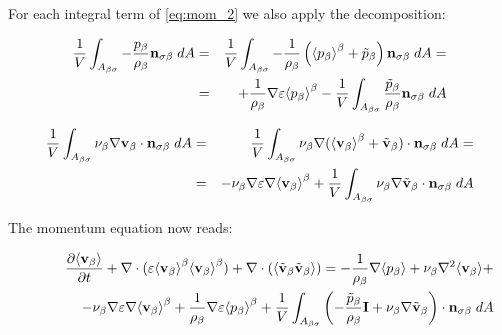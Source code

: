 For each integral term of \ref{eq:mom_2} we also apply the decomposition:

\begin{eqnarray}
\dfrac{1}{V} \int_{A_{\beta \sigma}}  -\dfrac{p_{\beta}}{\rho_{\beta}} \mathbf{n}_{\sigma \beta} \;dA &=& \dfrac{1}{V} \int_{A_{\beta \sigma}}  -\dfrac{1}{\rho_{\beta}} \left({\left< p_{\beta} \right>}^{\beta}  + \tilde{p}_{\beta}\right) \mathbf{n}_{\sigma \beta} \;dA = \nonumber \\
&=& +\dfrac{1}{\rho_{\beta}}\nabla\varepsilon {\left< p_{\beta}\right>}^{\beta} - \dfrac{1}{V} \int_{A_{\beta \sigma}} \dfrac{\tilde{p}_{\beta}}{\rho_{\beta}} \mathbf{n}_{\sigma \beta} \;dA
\end{eqnarray}


\begin{eqnarray}
\dfrac{1}{V} \int_{A_{\beta \sigma}} \nu_{\beta} \nabla \textbf{v}_{\beta} \cdot \mathbf{n}_{\sigma \beta} \;dA &=& \dfrac{1}{V} \int_{A_{\beta \sigma}} \nu_{\beta} \nabla ({\left< \textbf{v}_{\beta} \right>}^{\beta} +\tilde{\textbf{v}}_{\beta}) \cdot \mathbf{n}_{\sigma \beta} \;dA =  \nonumber \\
&=& - \nu_{\beta} \nabla \varepsilon \nabla {\left< \textbf{v}_{\beta}\right>}^{\beta} + \dfrac{1}{V} \int_{A_{\beta \sigma}} \nu_{\beta} \nabla \tilde{\textbf{v}}_{\beta} \cdot \mathbf{n}_{\sigma \beta} \;dA
\end{eqnarray}


The momentum equation now reads:

\begin{eqnarray}
\derp{\means{\vb}}{t} + \nabla \cdot (\varepsilon \meani{\vb}\meani{\vb}) + \nabla \cdot (\means{\vbt\vbt}) = -\dfrac{1}{\rho_{\beta}} \nabla \means{\pb} + \nub\nabla^2 \means{\vb} + \nonumber \\
\qquad \qquad - \nub \nabla \varepsilon \nabla \meani{\vb} +\dfrac{1}{\rho_{\beta}}\nabla\varepsilon \meani{\pb} +\dfrac{1}{V} \displaystyle\int_{A_{\beta \sigma}} \left( -\dfrac{\pbt}{\rho_{\beta}} \mathbf{I} + \nub \nabla \vbt  \right)\cdot \nbs \;dA
\label{eq:NS_2}
\end{eqnarray}

